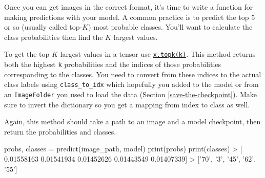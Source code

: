 \documentclass[11pt]{article}
\newenvironment{Shaded}{}{}
\newcommand{\FloatTok}[1]{\textcolor[rgb]{0.25,0.63,0.44}{{#1}}}
\newcommand{\StringTok}[1]{\textcolor[rgb]{0.25,0.44,0.63}{{#1}}}
\newcommand{\NormalTok}[1]{{#1}}
\newcommand{\OperatorTok}[1]{\textcolor[rgb]{0.40,0.40,0.40}{{#1}}}
\newcommand{\BuiltInTok}[1]{{#1}}
\begin{document}
Once you can get images in the correct format, it's time to write a
function for making predictions with your model. A common practice is to
predict the top 5 or so (usually called top-\(K\)) most probable
classes. You'll want to calculate the class probabilities then find the
\(K\) largest values.

To get the top \(K\) largest values in a tensor use
\href{http://pytorch.org/docs/master/torch.html\#torch.topk}{\texttt{x.topk(k)}}.
This method returns both the highest \texttt{k} probabilities and the
indices of those probabilities corresponding to the classes. You need to
convert from these indices to the actual class labels using
\texttt{class\_to\_idx} which hopefully you added to the model or from
an \texttt{ImageFolder} you used to load the data
(Section \ref{save-the-checkpoint}). Make sure to invert the dictionary
so you get a mapping from index to class as well.

Again, this method should take a path to an image and a model
checkpoint, then return the probabilities and classes.

\begin{Shaded}
\begin{Highlighting}[]
\NormalTok{probs, classes }\OperatorTok{=}\NormalTok{ predict(image_path, model)}
\BuiltInTok{print}\NormalTok{(probs)}
\BuiltInTok{print}\NormalTok{(classes)}
\OperatorTok{>}\NormalTok{ [ }\FloatTok{0.01558163}  \FloatTok{0.01541934}  \FloatTok{0.01452626}  \FloatTok{0.01443549}  \FloatTok{0.01407339}\NormalTok{]}
\OperatorTok{>}\NormalTok{ [}\StringTok{'70'}\NormalTok{, }\StringTok{'3'}\NormalTok{, }\StringTok{'45'}\NormalTok{, }\StringTok{'62'}\NormalTok{, }\StringTok{'55'}\NormalTok{]}
\end{Highlighting}
\end{Shaded}
\end{document}
